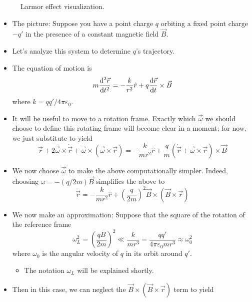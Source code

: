 \documentclass[../notes.tex]{subfiles}
\begin{document}
\begin{itemize}
\begin{figure}[h!]
        \caption{Larmor effect visualization.}
        \label{fig:larmorEffect}
    \end{figure}
    \begin{itemize}
        \item The picture: Suppose you have a point charge $q$ orbiting a fixed point charge $-q'$ in the presence of a constant magnetic field $\vec{B}$.
        \item Let's analyze this system to determine $q$'s trajectory.
        \item The equation of motion is
        \begin{equation*}
            m\dv[2]{\vec{r}}{t} = -\frac{k}{r^2}\hat{r}+q\dv{\vec{r}}{t}\times\vec{B}
        \end{equation*}
        where $k=qq'/4\pi\varepsilon_0$.
        \item It will be useful to move to a rotation frame. Exactly which $\vec{\omega}$ we should choose to define this rotating frame will become clear in a moment; for now, we just substitute to yield
        \begin{equation*}
            \ddot{\vec{r}}+2\vec{\omega}\times\dot{\vec{r}}+\vec{\omega}\times(\vec{\omega}\times\vec{r}) = -\frac{k}{mr^2}\hat{r}+\frac{q}{m}(\dot{\vec{r}}+\vec{\omega}\times\vec{r})\times\vec{B}
        \end{equation*}
        \item We now choose $\vec{\omega}$ to make the above computationally simpler. Indeed, choosing $\omega=-(q/2m)\vec{B}$ simplifies the above to
        \begin{equation*}
            \ddot{\vec{r}} = -\frac{k}{mr^2}\hat{r}+\left( \frac{q}{2m} \right)^2\vec{B}\times(\vec{B}\times\vec{r})
        \end{equation*}
        \item We now make an approximation: Suppose that the square of the rotation of the reference frame
        \begin{equation*}
            \omega_L^2 = \left( \frac{qB}{2m} \right)^2 \ll \frac{k}{mr^3} = \frac{qq'}{4\pi\varepsilon_0mr^3} \approx \omega_0^2
        \end{equation*}
        where $\omega_0$ is the angular velocity of $q$ in its orbit around $q'$.
        \begin{itemize}
            \item The notation $\omega_L$ will be explained shortly.
        \end{itemize}
        \item Then in this case, we can neglect the $\vec{B}\times(\vec{B}\times\vec{r})$ term to yield

\end{itemize}
\end{itemize}
\end{document}

